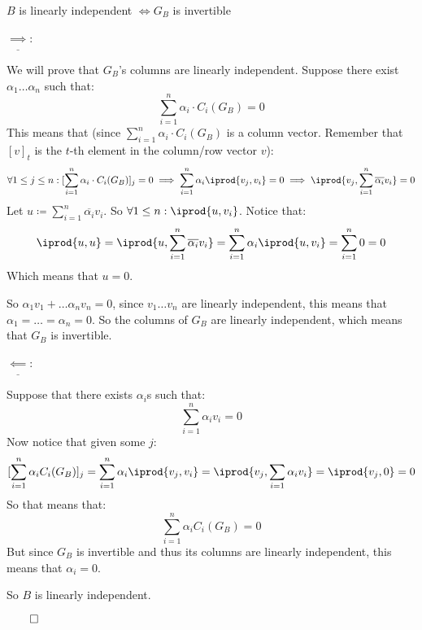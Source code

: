\documentclass[10pt]{article}
\begin{document}
\begin{theorem*}{$B$ is linearly independent $\iff G_B$ is invertible}

$\underline{\implies}$: \begin{minipage}[t]{\dimexpr\textwidth-2cm}

We will prove that $G_B$'s columns are linearly independent. Suppose there exist $\alpha_1\dots\alpha_n$ such that:
\[ \sum_{i=1}^n\alpha_i\cdot C_i(G_B) = 0 \]
This means that (since $\displaystyle\sum_{i=1}^n\alpha_i\cdot C_i(G_B)$ is a column vector. Remember that $[v]_t$ is the $t$-th element in the column/row vector $v$):
\[ \forall 1\leq j\leq n: [\sum_{i=1}^n\alpha_i\cdot C_i(G_B)]_j = 0 \implies \sum_{i=1}^n\alpha_i\iprod{v_j,v_i} = 0 \implies \iprod{v_j,\sum_{i=1}^n\overline{\alpha_i}v_i} = 0 \]
Let $u\coloneqq\displaystyle\sum_{i=1}^n\overline{\alpha_i}v_i$. So $\forall1\leq n: \iprod{u,v_i}$. Notice that:
\[ \iprod{u,u} = \iprod{u,\sum_{i=1}^n\overline{\alpha_i}v_i} = \sum_{i=1}^n\alpha_i\iprod{u,v_i} = \sum_{i=1}^n0 = 0 \]
Which means that $u=0$.

So $\alpha_1 v_1+\dots\alpha_n v_n=0$, since $v_1\dots v_n$ are linearly independent, this means that $\alpha_1=\dots=\alpha_n=0$. So the columns of $G_B$ are linearly independent, which means that $G_B$ is invertible.

\end{minipage}

\medskip

$\underline{\impliedby}$: \begin{minipage}[t]{\dimexpr\textwidth-2cm}

Suppose that there exists $\alpha_i$s such that:
\[ \sum_{i=1}^n\alpha_i v_i = 0 \]
Now notice that given some $j$:
\[ [\sum_{i=1}^n\alpha_i C_i(G_B)]_j = \sum_{i=1}^n\alpha_i \iprod{v_j,v_i} = \iprod{v_j,\sum_{i=1}\alpha_i v_i} = \iprod{v_j,0} = 0 \]
So that means that:
\[ \sum_{i=1}^n\alpha_i C_i(G_B) = 0 \]
But since $G_B$ is invertible and thus its columns are linearly independent, this means that $\alpha_i=0$. 

So $B$ is linearly independent.

\end{minipage}

$\qed$

\end{theorem*}
\end{document}

